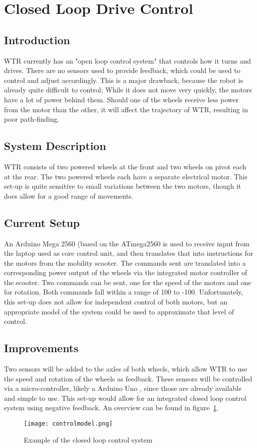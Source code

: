 \section{Closed Loop Drive Control}
\subsection{Introduction}
WTR currently has an "open loop control system" \cite{openloop} that controls how it turns and drives.
There are no sensors used to provide feedback, which could be used to control and adjust accordingly.
This is a major drawback, because the robot is already quite difficult to control; While it does not move very quickly, the motors have a lot of power behind them.
Should one of the wheels receive less power from the motor than the other, it will affect the trajectory of WTR, resulting in poor path-finding.

\subsection{System Description}
\label{subs::SysDes}
WTR consists of two powered wheels at the front and two wheels on pivot each at the rear.
The two powered wheels each have a separate electrical motor.
This set-up is quite sensitive to small variations between the two motors, though it does allow for a good range of movements.

\subsection{Current Setup}
An Arduino Mega 2560 (based on the ATmega2560 \cite{ardMega} is used to receive input from the laptop used as core control unit, and then translates that into instructions for the motors from the mobility scooter.
The commands sent are translated into a corresponding power output of the wheels via the integrated motor controller of the scooter.
Two commands can be sent, one for the speed of the motors and one for rotation.
Both commands fall within a range of 100 to -100.
Unfortunately, this set-up does not allow for independent control of both motors, but an appropriate model of the system could be used to approximate that level of control.

\subsection{Improvements}
Two sensors will be added to the axles of both wheels, which allow WTR to use the speed and rotation of the wheels as feedback.
These sensors will be controlled via a micro-controller, likely a Arduino Uno \cite{ardUno}, since those are already available and simple to use.
This set-up would allow for an integrated closed loop control system using negative feedback.
An overview can be found in figure~\ref{fig::cllp}.
\begin{figure}[H]
\centering
\texttt{[image: controlmodel.png]}
\caption{Example of the closed loop control system}
\label{fig::cllp}
\end{figure}
\newpage

